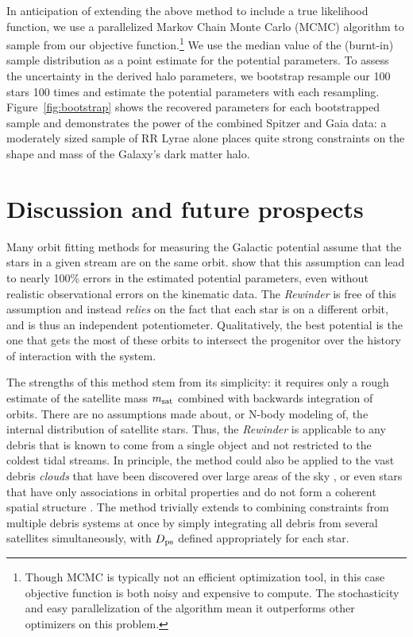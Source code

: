 \documentclass[preprint]{aastex}
\begin{document}
In anticipation of extending the above method to include a true
likelihood function, we use a parallelized Markov Chain Monte Carlo
(MCMC) algorithm \citep{foremanmackey2013} to sample from our
objective function.\footnote{Though MCMC is typically not an efficient
  optimization tool, in this case objective function is both noisy and
  expensive to compute. The stochasticity and easy parallelization of
  the algorithm mean it outperforms other optimizers on this problem.}
We use the median value of the (burnt-in) sample distribution as a
point estimate for the potential parameters. To assess the uncertainty
in the derived halo parameters, we bootstrap resample our 100 stars
100 times and estimate the potential parameters with each
resampling. Figure~\ref{fig:bootstrap} shows the recovered parameters
for each bootstrapped sample and demonstrates the power of the
combined Spitzer and Gaia data: a moderately sized sample of RR Lyrae
alone places quite strong constraints on the shape and mass of the
Galaxy's dark matter halo.


\section{Discussion and future prospects}
\label{sec:discussion}

Many orbit fitting methods for measuring the Galactic potential assume
that the stars in a given stream are on the same
orbit. \cite{sanders13a} show that this assumption can lead to nearly
100\% errors in the estimated potential parameters, even without
realistic observational errors on the kinematic data. The
\emph{Rewinder} is free of this assumption and instead \emph{relies}
on the fact that each star is on a different orbit, and is thus an
independent potentiometer. Qualitatively, the best potential is the
one that gets the most of these orbits to intersect the progenitor
over the history of interaction with the system.

The strengths of this method stem from its simplicity: it requires
only a rough estimate of the satellite mass $m_{\rm sat}$ combined
with backwards integration of orbits. There are no assumptions made
about, or N-body modeling of, the internal distribution of satellite
stars. Thus, the \emph{Rewinder} is applicable to any debris that is
known to come from a single object and not restricted to the coldest
tidal streams. In principle, the method could also be applied to the
vast debris {\it clouds} that have been discovered over large areas of
the sky \citep[e.g. the Triangulum Andromeda and Hercules-Aquila
  clouds]{rochapinto04,belokurov06}, or even stars that have only
associations in orbital properties and do not form a coherent spatial
structure \citep[such as the angular momentum groupings in local
  giants found by][]{helmi99}. The method trivially extends to
combining constraints from multiple debris systems at once by simply
integrating all debris from several satellites simultaneously, with
$D_{\rm ps}$ defined appropriately for each star.
\end{document}
